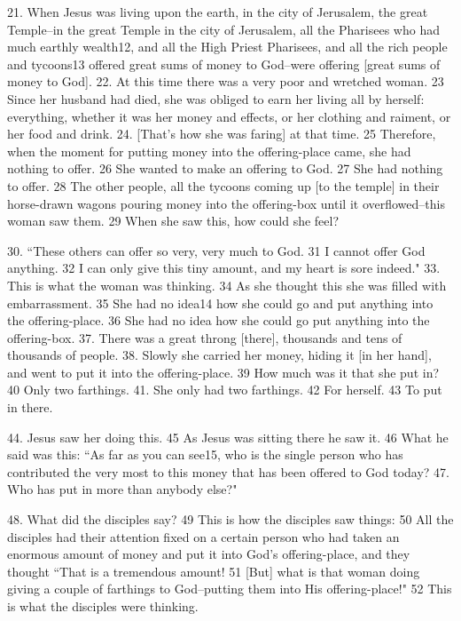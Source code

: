 \setcounter{footnote}{0}

21. When Jesus was living upon the earth, in the city of Jerusalem, the great Temple--in
the great Temple in the city of Jerusalem, all the Pharisees who had much earthly
wealth12, and all the High Priest Pharisees, and all the rich people and tycoons13
offered great sums of money to God--were offering [great sums of money to God].
22. At this time there was a very poor and wretched woman. 23 Since her husband
had died, she was obliged to earn her living all by herself: everything, whether
it was her money and effects, or her clothing and raiment, or her food and drink.
24. [That's how she was faring] at that time. 25 Therefore, when the moment for
putting money into the offering-place came, she had nothing to offer. 26 She wanted
to make an offering to God. 27 She had nothing to offer. 28 The other people, all
the tycoons coming up [to the temple] in their horse-drawn wagons pouring money
into the offering-box until it overflowed--this woman saw them. 29 When she saw
this, how could she feel?

30. ``These others can offer so very, very much to God. 31 I cannot offer
God anything. 32 I can only give this tiny amount, and my heart is sore indeed."
33. This is what the woman was thinking. 34 As she thought this she was filled with
embarrassment. 35 She had no idea14 how she could go and put anything into the
offering-place. 36 She had no idea how she could go put anything into the offering-box.
37. There was a great throng [there], thousands and tens of thousands of people.
38. Slowly she carried her money, hiding it [in her hand], and went to put it into
the offering-place. 39 How much was it that she put in? 40 Only two farthings.
41. She only had two farthings. 42 For herself. 43 To put in there.

44. Jesus saw her doing this. 45 As Jesus was sitting there he saw it. 46 What he
said was this: ``As far as you can see15, who is the single person who
has contributed the very most to this money that has been offered to God today?
47. Who has put in more than anybody else?"

48. What did the disciples say? 49 This is how the disciples saw things: 50 All
the disciples had their attention fixed on a certain person who had taken an enormous
amount of money and put it into God's offering-place, and they thought ``That
is a tremendous amount! 51 [But] what is that woman doing giving a couple of farthings
to God--putting them into His offering-place!" 52 This is what the disciples
were thinking.

